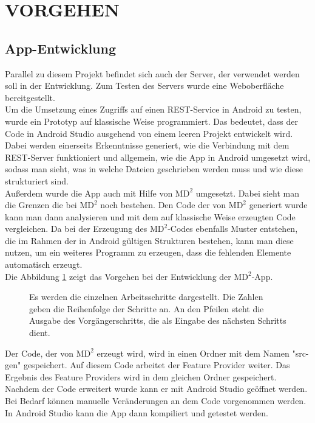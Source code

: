 \section{\uppercase{Vorgehen}}

\subsection{App-Entwicklung}

\noindent Parallel zu diesem Projekt befindet sich auch der Server, der verwendet werden soll in der Entwicklung. Zum Testen des Servers wurde eine Web\-ober\-fl\"ache bereitgestellt.\\
Um die Umsetzung eines Zugriffs auf einen REST-Service in Android zu testen, wurde ein Prototyp auf klassische Weise programmiert. Das bedeutet, dass der Code in Android Studio ausgehend von einem leeren Projekt entwickelt wird. Dabei werden einerseits Erkenntnisse generiert, wie die Verbindung mit dem REST-Server funktioniert und allgemein, wie die App in Android umgesetzt wird, sodass man sieht, was in welche Dateien geschrieben werden muss und wie diese strukturiert sind.\\
Au\ss{}erdem wurde die App auch mit Hilfe von $\text{MD}^2$ umgesetzt. Dabei sieht man die Grenzen die bei $\text{MD}^2$ noch bestehen. Den Code der von $\text{MD}^2$ generiert wurde kann man dann analysieren und mit dem auf klassische Weise erzeugten Code vergleichen. Da bei der Erzeugung des $\text{MD}^2$-Codes ebenfalls Muster entstehen, die im Rahmen der in Android g\"ultigen Strukturen bestehen, kann man diese nutzen, um ein weiteres Programm zu erzeugen, dass die fehlenden Elemente automatisch erzeugt.\\
Die Abbildung \ref{fig:Arbeitsschritte} zeigt das Vorgehen bei der Entwicklung der $\text{MD}^2$-App.

\begin{figure}[!h]
	\centering
	{}
	\caption{Es werden die einzelnen Arbeitsschritte dargestellt. Die Zahlen geben die Reihenfolge der Schritte an. An den Pfeilen steht die Ausgabe des Vorg\"angerschritts, die als Eingabe des n\"achsten Schritts dient.}
	\label{fig:Arbeitsschritte}
\end{figure}

\noindent Der Code, der von $\text{MD}^2$ erzeugt wird, wird in einen Ordner mit dem Namen "src-gen" gespeichert. Auf diesem Code arbeitet der Feature Provider weiter. Das Ergebnis des Feature Providers wird in dem gleichen Ordner gespeichert. Nachdem der Code erweitert wurde kann er mit Android Studio ge\"offnet werden. Bei Bedarf k\"onnen manuelle Ver\"anderungen an dem Code vorgenommen werden. In Android Studio kann die App dann kompiliert und getestet werden.

